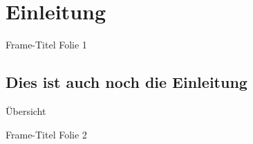 \section{Einleitung}
\begin{frame}{Frame-Titel}{}
Folie 1
\end{frame}

\subsection[Weiterhin Einleitung]{Dies ist auch noch die Einleitung}
\begin{frame}{Übersicht}{}
\end{frame}

\begin{frame}{Frame-Titel}{}
Folie 2
\end{frame}
